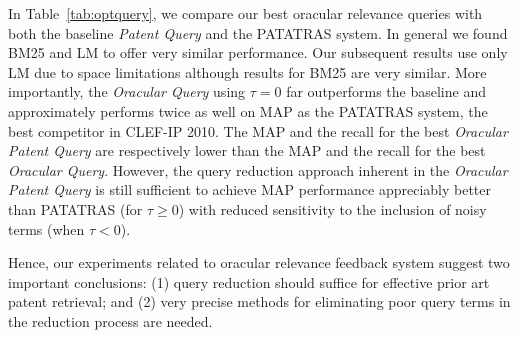 In Table~\ref{tab:optquery}, we compare our best oracular relevance
queries with both the baseline \textit{Patent Query} and the PATATRAS
system.  In general we found BM25 and LM to offer very similar
performance.  Our subsequent results use only LM due to space
limitations although results for BM25 are very similar.  More
importantly, the \emph{Oracular Query} using $\tau=0$ far
outperforms the baseline and approximately performs twice as well on
MAP as the PATATRAS system, the best competitor in CLEF-IP 2010.  The
MAP and the recall for the best \emph{Oracular Patent Query} are
respectively lower than the MAP and the recall for the
best \emph{Oracular Query}.  However, the query reduction approach
inherent in the \emph{Oracular Patent Query} is still sufficient to
achieve MAP performance appreciably better than PATATRAS (for
$\tau \geq 0$) with reduced sensitivity to the inclusion of noisy
terms (when $\tau < 0$).


%
%



Hence, our experiments related to oracular relevance feedback system
suggest two important conclusions: (1) query reduction should suffice for effective prior art patent retrieval; and (2) very precise methods for eliminating poor query terms in the reduction process are needed.


